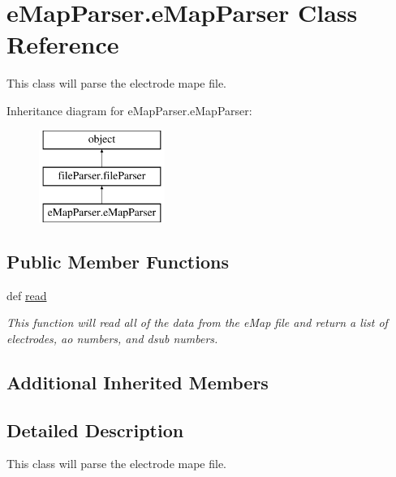 \hypertarget{classe_map_parser_1_1e_map_parser}{\section{e\-Map\-Parser.\-e\-Map\-Parser Class Reference}
\label{classe_map_parser_1_1e_map_parser}
}


This class will parse the electrode mape file.  


Inheritance diagram for e\-Map\-Parser.\-e\-Map\-Parser\-:\begin{figure}[H]
\begin{center}
\leavevmode
\includegraphics[height=3.000000cm]{classe_map_parser_1_1e_map_parser}
\end{center}
\end{figure}
\subsection*{Public Member Functions}
\begin{DoxyCompactItemize}
\item 
def \hyperlink{classe_map_parser_1_1e_map_parser_aa0199d0342cb5e5714ef75fbc0fcd857}{read}
\begin{DoxyCompactList}\small\item\em This function will read all of the data from the e\-Map file and return a list of electrodes, ao numbers, and dsub numbers. \end{DoxyCompactList}\end{DoxyCompactItemize}
\subsection*{Additional Inherited Members}


\subsection{Detailed Description}
This class will parse the electrode mape file. 



